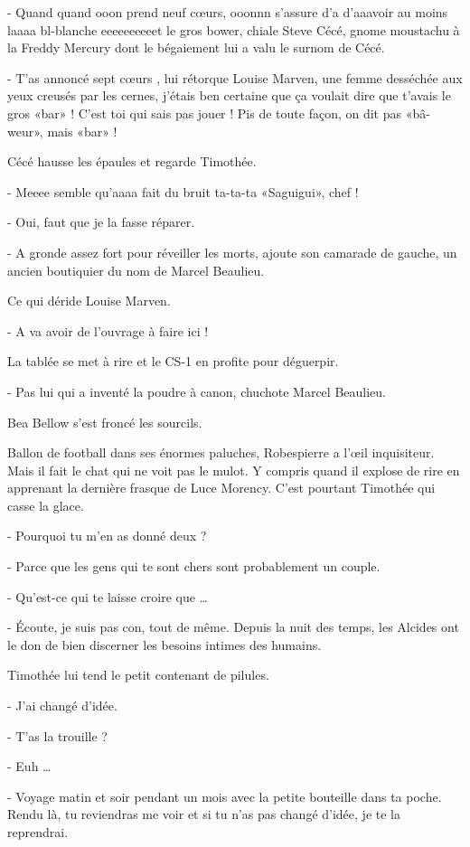 - Quand quand ooon prend neuf cœurs, ooonnn s’assure d’a d’aaavoir au moins laaaa bl-blanche eeeeeeeeeet le gros bower, chiale Steve Cécé, gnome moustachu à la Freddy Mercury dont le bégaiement lui a valu le surnom de Cécé.

- T’as annoncé sept cœurs , lui rétorque Louise Marven, une femme desséchée aux yeux creusés par les cernes, j’étais ben certaine que ça voulait dire que t’avais le gros «bar» ! C’est toi qui sais pas jouer ! Pis de toute façon, on dit pas «bâ-weur», mais «bar» !

Cécé hausse les épaules et regarde Timothée.

- Meeee semble qu’aaaa fait du bruit ta-ta-ta «Saguigui», chef !

- Oui, faut que je la fasse réparer.

- A gronde assez fort pour réveiller les morts, ajoute son camarade de gauche, un ancien boutiquier du nom de Marcel Beaulieu.

Ce qui déride Louise Marven.

- A va avoir de l’ouvrage à faire ici !

La tablée se met à rire et le CS-1 en profite pour déguerpir.

- Pas lui qui a inventé la poudre à canon, chuchote Marcel Beaulieu.

Bea Bellow s’est froncé les sourcils.

Ballon de football dans ses énormes paluches, Robespierre a l’œil inquisiteur. Mais il fait le chat qui ne voit pas le mulot. Y compris quand il explose de rire en apprenant la dernière frasque de Luce Morency. C’est pourtant Timothée qui casse la glace.

- Pourquoi tu m’en as donné deux ?

- Parce que les gens qui te sont chers sont probablement un couple.

- Qu’est-ce qui te laisse croire que …

- Écoute, je suis pas con, tout de même. Depuis la nuit des temps, les Alcides ont le don de bien discerner les besoins intimes des humains.

Timothée lui tend le petit contenant de pilules.

- J’ai changé d’idée.

- T’as la trouille ?

- Euh …

- Voyage matin et soir pendant un mois avec la petite bouteille dans ta poche. Rendu là, tu reviendras me voir et si tu n’as pas changé d’idée, je te la reprendrai.

